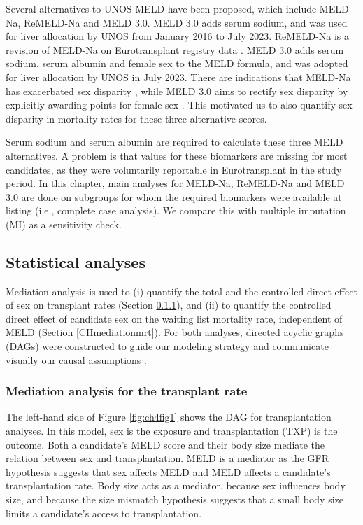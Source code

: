 \documentclass[11pt,twoside,]{book}
\begin{document}
Several alternatives to UNOS-MELD have been proposed, which include MELD-Na,
ReMELD-Na and MELD 3.0. MELD 3.0 adds serum sodium, and was used for
liver allocation by UNOS from January 2016 to July 2023. ReMELD-Na
is a revision of MELD-Na on Eurotransplant registry data \citep{goudsmitRefittingModelEndstage2020}.
MELD 3.0 adds serum sodium, serum albumin and female sex to the MELD formula,
and was adopted for liver allocation by UNOS in July 2023. There are indications that
MELD-Na has exacerbated sex disparity \citep{allenReducedAccessLiver2018}, while MELD
3.0 aims to rectify sex disparity by explicitly awarding points for female sex
\citep{kimMELD3point0}. This motivated us to also quantify sex disparity in mortality rates
for these three alternative scores.

Serum sodium and serum albumin are required to calculate these three MELD
alternatives. A problem is that values for these biomarkers are missing for
most candidates, as they were voluntarily reportable in Eurotransplant in the
study period. In this
chapter, main analyses for MELD-Na, ReMELD-Na and MELD 3.0 are done on subgroups
for whom the required biomarkers were available at listing (i.e., complete case analysis).
We compare this with multiple imputation (MI) as a sensitivity check.

\subsection{Statistical analyses}\label{statistical-analyses}

Mediation analysis is used to (i) quantify the total and the controlled direct
effect of sex on transplant rates (Section \ref{CHmediationtxp}),
and (ii) to quantify the controlled direct effect of candidate sex on the
waiting list mortality rate, independent of MELD (Section \ref{CHmediationmrt}).
For both analyses, directed acyclic graphs (DAGs) were constructed to guide
our modeling strategy and communicate visually our causal assumptions
\citep{lipskyCausalDirectedAcyclic2022}.

\subsubsection{Mediation analysis for the transplant rate}\label{CHmediationtxp}

The left-hand side of Figure \ref{fig:ch4fig1} shows the DAG for transplantation
analyses. In this model, sex is the exposure and
transplantation (TXP) is the outcome. Both a candidate's MELD score and their
body size mediate the relation between sex and transplantation. MELD is a
mediator as the GFR hypothesis suggests that sex affects MELD and
MELD affects a candidate's transplantation rate. Body size acts as a mediator,
because sex influences body size, and because the size mismatch hypothesis
suggests that a small body size limits a candidate's access to transplantation.
\end{document}

